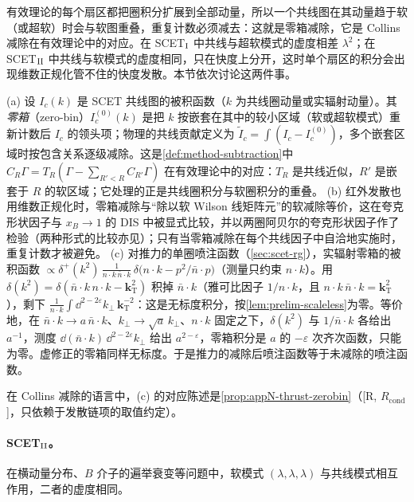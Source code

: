 有效理论的每个扇区都把圈积分扩展到全部动量，所以一个共线图在其动量趋于软（或超软）时会与软图重叠，重复计数必须减去：这就是零箱减除，它是 Collins 减除在有效理论中的对应。在 SCET$_{\rm I}$ 中共线与超软模式的虚度相差 $\lambda^2$；在 SCET$_{\rm II}$ 中共线与软模式的虚度相同，只在快度上分开，这时单个扇区的积分会出现维数正规化管不住的快度发散。本节依次讨论这两件事。

\begin{definition}[零箱减除]\label{def:scet-zero-bin}
(a) 设 $I_c(k)$ 是 SCET 共线图的被积函数（$k$ 为共线圈动量或实辐射动量）。其\emph{零箱}（zero-bin）$I_c^{(0)}(k)$ 是把 $k$ 按嵌套在其中的较小区域（软或超软模式）重新计数后 $I_c$ 的领头项；物理的共线贡献定义为 $\tilde I_c=\int(I_c-I_c^{(0)})$，多个嵌套区域时按包含关系逐级减除\cite{ManoharStewart2007}。这是\cref{def:method-subtraction}中 $C_R\Gamma=T_R(\Gamma-\sum_{R'<R}C_{R'}\Gamma)$ 在有效理论中的对应：$T_R$ 是共线近似，$R'$ 是嵌套于 $R$ 的软区域；它处理的正是共线圈积分与软圈积分的重叠。
(b) 红外发散也用维数正规化时，零箱减除与“除以软 Wilson 线矩阵元”的软减除等价，这在夸克形状因子与 $x_B\to1$ 的 DIS 中被显式比较，并以两圈阿贝尔的夸克形状因子作了检验\cite{IdilbiMehen2007}（两种形式的比较亦见\cite{Lee:2006nr}）；只有当零箱减除在每个共线因子中自洽地实施时，重复计数才被避免。
(c) 对推力的单圈喷注函数（\cref{sec:scet-rg}），实辐射零箱的被积函数 $\propto\delta^+(k^2)\,\frac{1}{n\cdot k\,\bar n\cdot k}\,\delta\big(n\cdot k-p^2/\bar n\cdot p\big)$（测量只约束 $n\cdot k$）。用 $\delta(k^2)=\delta(\bar n\cdot k\,n\cdot k-\bm k_{\mathrm T}^2)$ 积掉 $\bar n\cdot k$（雅可比因子 $1/n\cdot k$，且 $n\cdot k\,\bar n\cdot k=\bm k_{\mathrm T}^2$），剩下 $\frac{1}{n\cdot k}\int\dd^{2-2\varepsilon}k_\perp\,\bm k_{\mathrm T}^{-2}$：这是无标度积分，按\cref{lem:prelim-scaleless}为零。等价地，在 $\bar n\cdot k\to a\,\bar n\cdot k$、$k_\perp\to\sqrt a\,k_\perp$、$n\cdot k$ 固定之下，$\delta(k^2)$ 与 $1/\bar n\cdot k$ 各给出 $a^{-1}$，测度 $\dd(\bar n\cdot k)\,\dd^{2-2\varepsilon}k_\perp$ 给出 $a^{2-\varepsilon}$，零箱积分是 $a$ 的 $-\varepsilon$ 次齐次函数，只能为零。虚修正的零箱同样无标度。于是推力的减除后喷注函数等于未减除的喷注函数。%
\end{definition}

在 Collins 减除的语言中，(c) 的对应陈述是\cref{prop:appN-thrust-zerobin}（[R, $R_{\mathrm{cond}}$]，只依赖于发散链项的取值约定）。

\paragraph{SCET$_{\rm II}$。}在横动量分布、$B$ 介子的遍举衰变等问题中，软模式 $(\lambda,\lambda,\lambda)$ 与共线模式相互作用，二者的虚度相同。

